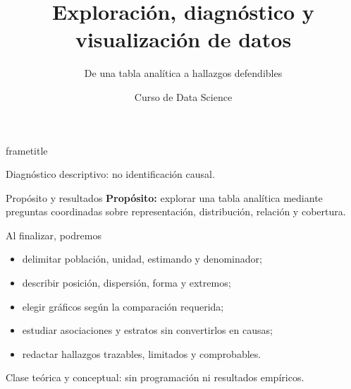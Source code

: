 \documentclass[aspectratio=169,11pt]{beamer}
\title[Data Science · Clase 3]{Exploración, diagnóstico y visualización de datos}
\subtitle{De una tabla analítica a hallazgos defendibles}
\author{Curso de Data Science}
\institute{Semana 3 · Clase 3}
\date{}
\newcommand{\br}{\\}
\begin{document}
\begin{frame}[plain]
  \begin{beamercolorbox}[wd=\paperwidth,ht=\paperheight,sep=2em]{frametitle}
    \vfill
    {\Huge\inserttitle\par}
    \vspace{0.45em}
    {\Large\insertsubtitle\par}
    \vspace{1.3em}
    \vspace{1.2em}
    {\color{white}\large\insertauthor\par}
    {\color{white}\insertinstitute\par}
    \vfill
    {\color{UAPGold}\small Diagnóstico descriptivo: no identificación causal.}
  \end{beamercolorbox}
\end{frame}

\begin{frame}{Propósito y resultados}
  \small
  \textbf{Propósito:} explorar una tabla analítica mediante preguntas coordinadas sobre representación, distribución, relación y cobertura.
  \begin{block}{Al finalizar, podremos}
    \begin{itemize}
      \item delimitar población, unidad, estimando y denominador;
      \item describir posición, dispersión, forma y extremos;
      \item elegir gráficos según la comparación requerida;
      \item estudiar asociaciones y estratos sin convertirlos en causas;
      \item redactar hallazgos trazables, limitados y comprobables.
    \end{itemize}
  \end{block}
  \centering Clase teórica y conceptual: sin programación ni resultados empíricos.
\end{frame}
\end{document}
